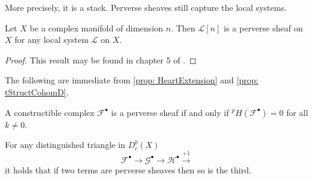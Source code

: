   More precisely, it is a stack.
  Perverse sheaves still capture the local systems.
  \begin{theorem}
    Let $X$ be a complex manifold of dimension $n$. Then $\mathcal{L}[n]$ is a perverse sheaf on $X$ for any local system $\mathcal{L}$ on $X$.
  \end{theorem}
  \begin{proof}
    This result may be found in chapter 5 of \cite{dimca2004sheaves}.
  \end{proof}
  The following are immediate from \cref{prop: HeartExtension} and \cref{prop: tStructCohomD}.
  \begin{proposition}
    A constructible complex $\mathcal{F}^\bullet$ is a perverse sheaf if and only if $^pH(\mathcal{F}^\bullet) = 0$ for all $k\neq 0$.
  \end{proposition}
  \begin{proposition}
    For any distinguished triangle in $D_c^b(X)$
    $$\mathcal{F}^\bullet \to \mathcal{G}^\bullet \to \mathcal{H}^\bullet \xrightarrow{+1} $$
    it holds that if two terms are perverse sheaves then so is the third.
  \end{proposition}
